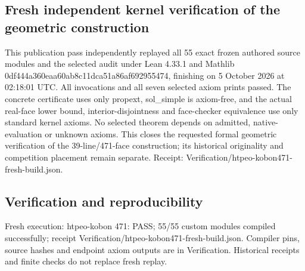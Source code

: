 \documentclass[11pt,a4paper]{article}
\begin{document}
\subsection{Fresh independent kernel verification of the geometric construction}
This publication pass independently replayed all 55 exact frozen authored source modules and the selected audit under Lean 4.33.1 and Mathlib 0df444a360eaa60ab8c11dca51a86af692955474, finishing on 5 October 2026 at 02:18:01 UTC. All invocations and all seven selected axiom prints passed. The concrete certificate uses only propext, sol\_simple is axiom-free, and the actual real-face lower bound, interior-disjointness and face-checker equivalence use only standard kernel axioms. No selected theorem depends on admitted, native-evaluation or unknown axioms. This closes the requested formal geometric verification of the 39-line/471-face construction; its historical originality and competition placement remain separate. Receipt: Verification/htpeo-kobon471-fresh-build.json.

\subsection{Verification and reproducibility}
Fresh execution: htpeo-kobon 471: PASS; 55/55 custom modules compiled successfully; receipt Verification/htpeo-kobon471-fresh-build.json. Compiler pins, source hashes and endpoint axiom outputs are in Verification. Historical receipts and finite checks do not replace fresh replay.
\end{document}
